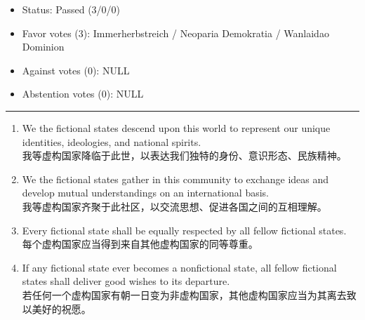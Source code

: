 



\begin{itemize}
	\item Status: Passed (3/0/0)
	\item Favor votes (3): Immerherbstreich / Neoparia Demokratia / Wanlaidao Dominion
	\item Against votes (0): NULL
	\item Abstention votes (0): NULL
\end{itemize}

\hrule

\begin{enumerate}
	\item We the fictional states descend upon this world to represent our unique identities, ideologies, and national spirits.\\
	      我等虚构国家降临于此世，以表达我们独特的身份、意识形态、民族精神。
	\item We the fictional states gather in this community to exchange ideas and develop mutual understandings on an international basis.\\
	      我等虚构国家齐聚于此社区，以交流思想、促进各国之间的互相理解。
	\item Every fictional state shall be equally respected by all fellow fictional states.\\
	      每个虚构国家应当得到来自其他虚构国家的同等尊重。
	\item If any fictional state ever becomes a nonfictional state,
	      all fellow fictional states shall deliver good wishes to its departure.\\
          若任何一个虚构国家有朝一日变为非虚构国家，其他虚构国家应当为其离去致以美好的祝愿。
\end{enumerate}



